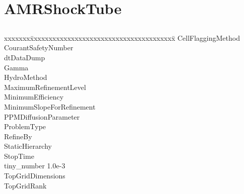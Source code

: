 \documentclass{book}
\begin{document}
\subsection{\cello}

\section{AMRShockTube} \label{s:AMRShockTube}

\subsection{\enzo}

{\parametersize
\begin{tabbing}
xxxxxxx\=xxxxxxxxxxxxxxxxxxxxxxxxxxxxxxxxxxxxxxx\=\kill
\> CellFlaggingMethod         \\
\> CourantSafetyNumber     \\
\> dtDataDump              \\
\> Gamma                   \\
\> HydroMethod             \\
\> MaximumRefinementLevel         \\
\> MinimumEfficiency            \\
\> MinimumSlopeForRefinement    \\
\> PPMDiffusionParameter          \\
\> ProblemType                    \\
\> RefineBy                       \\
\> StaticHierarchy                \\
\> StopTime                \\
\> tiny\_number            \> 1.0e-3   \\
\> TopGridDimensions       \\
\> TopGridRank            
\end{tabbing}}

\end{document}

